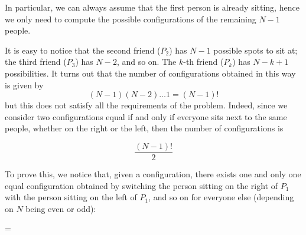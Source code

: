 \documentclass[a4paper,10 pt]{report}
\newcommand{\finalanswer}[1]{%
    \begin{finalAnswer}
    \[
        #1
    \]
    \end{finalAnswer}
}
\theoremstyle{definition}
\begin{document}
\begin{solutionBox}
    In particular, we can always assume that the first person is already sitting, hence we only need to compute the possible configurations of the remaining $N - 1$ people.

\vspace{.5em}

	It is easy to notice that the second friend ($P_2$) has $N - 1$ possible spots to sit at; the third friend ($P_3$) has $N - 2$, and so on. The $k$-th friend ($P_k$) has $N - k + 1$ possibilities. It turns out that the number of configurations obtained in this way is given by
\[
(N - 1)(N - 2) \dots 1 = (N - 1)!
\]
but this does not satisfy all the requirements of the problem. Indeed, since we consider two configurations equal if and only if everyone sits next to the same people, whether on the right or the left, then the number of configurations is
\finalanswer{\frac{(N - 1)!}{2}}
To prove this, we notice that, given a configuration, there exists one and only one equal configuration obtained by switching the person sitting on the right of $P_1$ with the person sitting on the left of $P_1$, and so on for everyone else (depending on $N$ being even or odd):

	    \begin{center}
        \begin{minipage}{.25\textwidth}
        \end{minipage}
        \quad = \quad
        \begin{minipage}{.25\textwidth}
        \end{minipage}
    \end{center}
    

\end{solutionBox}
\end{document}
